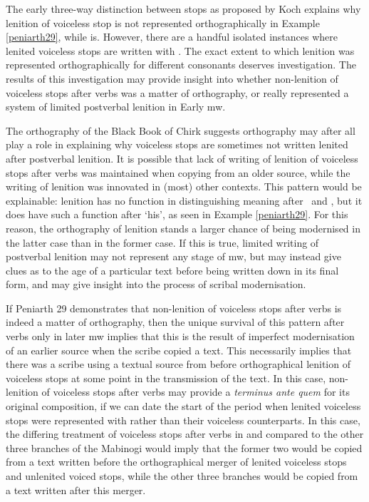  The early three-way distinction between stops as proposed by Koch explains why lenition of voiceless stop  is not represented orthographically in Example \ref{peniarth29}, while  is. However, there are a handful isolated instances where lenited voiceless stops are written with . The exact extent to which lenition was represented orthographically for different consonants deserves investigation. The results of this investigation may provide insight into whether non-lenition of voiceless stops after verbs was a matter of orthography, or really represented a system of limited postverbal lenition in Early \gls{mw}.

The orthography of the Black Book of Chirk suggests orthography may after all play a role in explaining why voiceless stops are sometimes not written lenited after postverbal lenition. It is possible that lack of writing of lenition of voiceless stops after verbs was maintained when copying from an older source, while the writing of lenition was innovated in (most) other contexts. This pattern would be explainable: lenition has no function in distinguishing meaning after \ei\ and \oes, but it does have such a function after  `his', as seen in Example \ref{peniarth29}. For this reason, the orthography of lenition stands a larger chance of being modernised in the latter case than in the former case. If this is true, limited writing of postverbal lenition may not represent any stage of \gls{mw}, but may instead give clues as to the age of a particular text before being written down in its final form, and may give insight into the process of scribal modernisation.

 If Peniarth 29 demonstrates that non-lenition of voiceless stops after verbs is indeed a matter of orthography, then the unique survival of this pattern after verbs only in later \gls{mw} implies that this is the result of imperfect modernisation of an earlier source when the scribe copied a text. This necessarily implies that there was a scribe using a textual source from before orthographical lenition of voiceless stops at some point in the transmission of the text. In this case, non-lenition of voiceless stops after verbs may provide a \textit{terminus ante quem} for its original composition, if we can date the start of the period when lenited voiceless stops were represented with  rather than their voiceless counterparts. In this case, the differing treatment of voiceless stops after verbs in  and  compared to the other three branches of the Mabinogi would imply that the former two would be copied from a text written before the orthographical merger of lenited voiceless stops and unlenited voiced stops, while the other three branches would be copied from a text written after this merger. 
 
